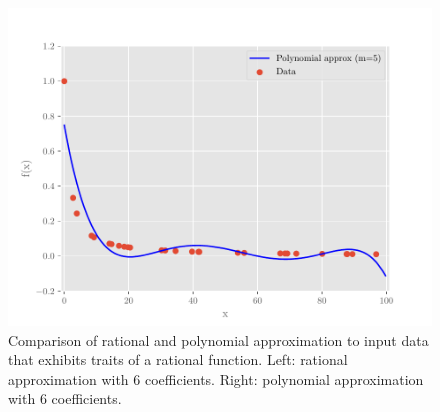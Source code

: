 \begin{figure}
\begin{minipage}{.48\textwidth}
\begin{center}
            \includegraphics[width=.98\textwidth]{code/test04_05_0.pdf}
        \end{center}
    \end{minipage}%
    \centering
    \caption{Comparison of rational and polynomial approximation to input data
    that exhibits traits of a rational function. Left: rational approximation
with 6 coefficients. Right: polynomial approximation with 6 coefficients.}
    \label{fig:cmp}
\end{figure}





